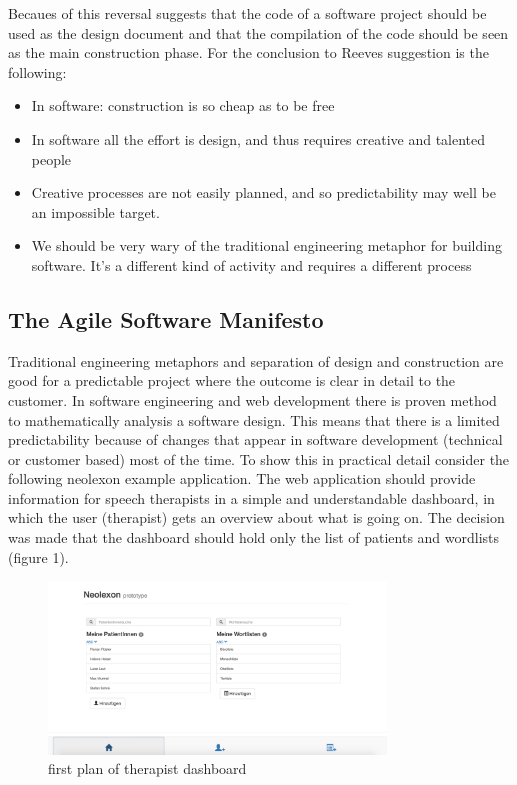Becaues of this reversal \cite{reeves1992software} suggests that the code of a software project should be used as the design document and that the compilation of the
code should be seen as the main construction phase. For \cite{fowler2001new} the conclusion to Reeves suggestion is the following:
\begin{itemize}
  \item In software: construction is so cheap as to be free
  \item In software all the effort is design, and thus requires creative and talented people
  \item Creative processes are not easily planned, and so predictability may well be an impossible target.
  \item We should be very wary of the traditional engineering metaphor for building software. It's a different kind of activity and requires a different process
\end{itemize}

\newpage

\subsection{The Agile Software Manifesto}
Traditional engineering metaphors and separation of design and construction are good for a predictable project where the outcome is clear in
detail to the customer. In software engineering and web development there is proven method to mathematically analysis a software design. This means that there is
a limited predictability because of changes that appear in software development (technical or customer based) most of the time. To show this in practical detail
consider the following neolexon example application. The web application should provide information for speech therapists in a simple and understandable dashboard,
in which the user (therapist) gets an overview about what is going on. The decision was made that the dashboard should hold only the list of patients and wordlists (figure 1).

\begin{figure}[h!]
  \centering
  \includegraphics[width=0.8\textwidth]{images/patientsandlists.png}
  \caption{first plan of therapist dashboard}
\end{figure}

